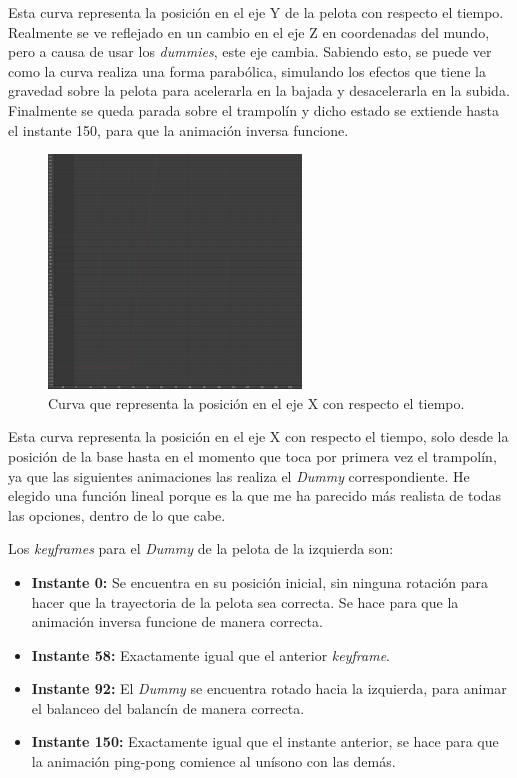 \documentclass{article}
\begin{document}
Esta curva representa la posición en el eje Y de la pelota con respecto el tiempo. Realmente se ve reflejado en un cambio en el eje Z en coordenadas del mundo, pero a causa de usar los \textit{dummies}, este eje cambia. Sabiendo esto, se puede ver como la curva realiza una forma parabólica, simulando los efectos que tiene la gravedad sobre la pelota para acelerarla en la bajada y desacelerarla en la subida. Finalmente se queda parada sobre el trampolín y dicho estado se extiende hasta el instante 150, para que la animación inversa funcione.

\begin{figure}[H]
   \centering
   \includegraphics[width=0.6\textwidth]{imagenes/curvas/PL/pelota/red.png}
   \caption{Curva que representa la posición en el eje X con respecto el tiempo.}
\end{figure}

Esta curva representa la posición en el eje X con respecto el tiempo, solo desde la posición de la base hasta en el momento que toca por primera vez el trampolín, ya que las siguientes animaciones las realiza el \textit{Dummy} correspondiente. He elegido una función lineal porque es la que me ha parecido más realista de todas las opciones, dentro de lo que cabe. 


Los \textit{keyframes} para el \textit{Dummy} de la pelota de la izquierda son:

\begin{itemize}
    \item \textbf{Instante 0: }Se encuentra en su posición inicial, sin ninguna rotación para hacer que la trayectoria de la pelota sea correcta. Se hace para que la animación inversa funcione de manera correcta.
    \item \textbf{Instante 58: }Exactamente igual que el anterior \textit{keyframe}.
    \item \textbf{Instante 92: }El \textit{Dummy} se encuentra rotado hacia la izquierda, para animar el balanceo del balancín de manera correcta.
    \item \textbf{Instante 150: }Exactamente igual que el instante anterior, se hace para que la animación ping-pong comience al unísono con las demás.
\end{itemize}
\end{document}

